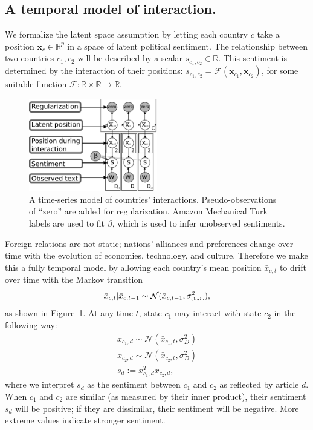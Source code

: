\subsection{A temporal model of interaction.}
We formalize the latent space assumption by letting each country $c$
take a position $\bm x_c \in \mathbb{R}^p$ in a space of latent
political sentiment. The relationship between two countries $c_1, c_2$
will be described by a scalar $s_{c_1,c_2} \in \mathbb{R}$.  This
sentiment is determined by the interaction of their positions:
$s_{c_1, c_2} = \mathcal{F}(\bm x_{c_1}, \bm x_{c_2})$, for some
suitable function $\mathcal{F}: \mathbb{R} \times \mathbb{R}
\rightarrow \mathbb{R}$.

\begin{figure}
  \center
  \vspace{-55pt}
  \includegraphics[width=0.5\textwidth]{chapter_foreign_relations/figures/countries_gm.pdf}
  \caption{A time-series model of countries' interactions.
    Pseudo-observations of ``zero'' are added for regularization.
    Amazon Mechanical Turk labels are used to fit $\beta$, which is
    used to infer unobserved sentiments.}
  \label{figure:gm}
\end{figure}

Foreign relations are not static; nations' alliances and preferences
change over time with the evolution of economies, technology, and
culture.  Therefore we make this a fully temporal model by
allowing each country's mean position $\bar x_{c,t}$ to drift over
time with the Markov transition
\begin{align}
  \bar x_{c,t} | \bar x_{c,t-1} \sim \mathcal{N}(\bar x_{c,t-1}, \sigma_{\mbox{\tiny chain}}^2),
\end{align}
as shown in Figure~\ref{figure:gm}. At any time $t$, state $c_1$ may interact with state $c_2$ in the following way:
\begin{align}
  x_{c_1,d} \sim \mathcal{N}(\bar x_{c_1, t}, \sigma_D^2) \nonumber \\
  x_{c_2,d} \sim \mathcal{N}(\bar x_{c_2, t}, \sigma_D^2) \nonumber \\
  s_d := x_{c_1,d}^T x_{c_2,d}, \label{eq:sentiment_space}
\end{align}
where we interpret $s_d$ as the sentiment between $c_1$ and $c_2$ as
reflected by article $d$.  When $c_1$ and $c_2$ are similar (as
measured by their inner product), their sentiment $s_d$ will be
positive; if they are dissimilar, their sentiment will be negative.
More extreme values indicate stronger sentiment.

